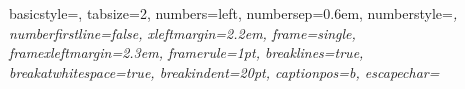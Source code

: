 
{
	basicstyle=\ttfamily\footnotesize,
	tabsize=2,
	numbers=left,
	numbersep=0.6em,			%
	numberstyle=\footnotesize\ttfamily\itshape,
	numberfirstline=false,
	xleftmargin=2.2em,		%
	frame=single,			%
	framexleftmargin=2.3em,	%
	framerule=1pt,
	breaklines=true,
	breakatwhitespace=true,
	breakindent=20pt,
	captionpos=b,
	escapechar=~
}

{
	\fancyhf{}	%
	\fancyhead[LE,RO] {\thepage}
	\renewcommand {\headrulewidth}{0pt}
	\renewcommand {\footrulewidth}{0pt}
}